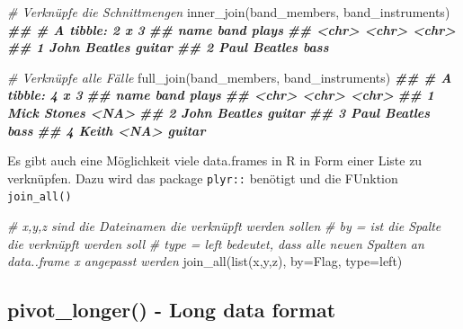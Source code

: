 \documentclass[
]{article}
\newenvironment{Shaded}{\begin{snugshade}}{\end{snugshade}}
\newcommand{\AttributeTok}[1]{\textcolor[rgb]{0.77,0.63,0.00}{#1}}
\newcommand{\CommentTok}[1]{\textcolor[rgb]{0.56,0.35,0.01}{\textit{#1}}}
\newcommand{\DocumentationTok}[1]{\textcolor[rgb]{0.56,0.35,0.01}{\textbf{\textit{#1}}}}
\newcommand{\FunctionTok}[1]{\textcolor[rgb]{0.00,0.00,0.00}{#1}}
\newcommand{\NormalTok}[1]{#1}
\newcommand{\StringTok}[1]{\textcolor[rgb]{0.31,0.60,0.02}{#1}}
\begin{document}
\begin{Shaded}
\begin{Highlighting}[]
\CommentTok{\# Verknüpfe die Schnittmengen}
\FunctionTok{inner\_join}\NormalTok{(band\_members, band\_instruments)}
\DocumentationTok{\#\# \# A tibble: 2 x 3}
\DocumentationTok{\#\#   name  band    plays }
\DocumentationTok{\#\#   \textless{}chr\textgreater{} \textless{}chr\textgreater{}   \textless{}chr\textgreater{} }
\DocumentationTok{\#\# 1 John  Beatles guitar}
\DocumentationTok{\#\# 2 Paul  Beatles bass}

\CommentTok{\# Verknüpfe alle Fälle}
\FunctionTok{full\_join}\NormalTok{(band\_members, band\_instruments)}
\DocumentationTok{\#\# \# A tibble: 4 x 3}
\DocumentationTok{\#\#   name  band    plays }
\DocumentationTok{\#\#   \textless{}chr\textgreater{} \textless{}chr\textgreater{}   \textless{}chr\textgreater{} }
\DocumentationTok{\#\# 1 Mick  Stones  \textless{}NA\textgreater{}  }
\DocumentationTok{\#\# 2 John  Beatles guitar}
\DocumentationTok{\#\# 3 Paul  Beatles bass  }
\DocumentationTok{\#\# 4 Keith \textless{}NA\textgreater{}    guitar}
\end{Highlighting}
\end{Shaded}

Es gibt auch eine Möglichkeit viele data.frames in R in Form einer Liste zu verknüpfen. Dazu wird das package \texttt{plyr::} benötigt und die FUnktion \texttt{join\_all()}

\begin{Shaded}
\begin{Highlighting}[]
\CommentTok{\# x,y,z sind die Dateinamen die verknüpft werden sollen}
\CommentTok{\# by = ist die Spalte die verknüpft werden soll}
\CommentTok{\# type = left bedeutet, dass alle neuen Spalten an data..frame x angepasst werden}
\FunctionTok{join\_all}\NormalTok{(}\FunctionTok{list}\NormalTok{(x,y,z), }\AttributeTok{by=}\StringTok{\textquotesingle{}Flag\textquotesingle{}}\NormalTok{, }\AttributeTok{type=}\StringTok{\textquotesingle{}left\textquotesingle{}}\NormalTok{) }
\end{Highlighting}
\end{Shaded}

\hypertarget{pivot_longer---long-data-format}{%
\subsection{pivot\_longer() - Long data format}\label{pivot_longer---long-data-format}}
\end{document}
